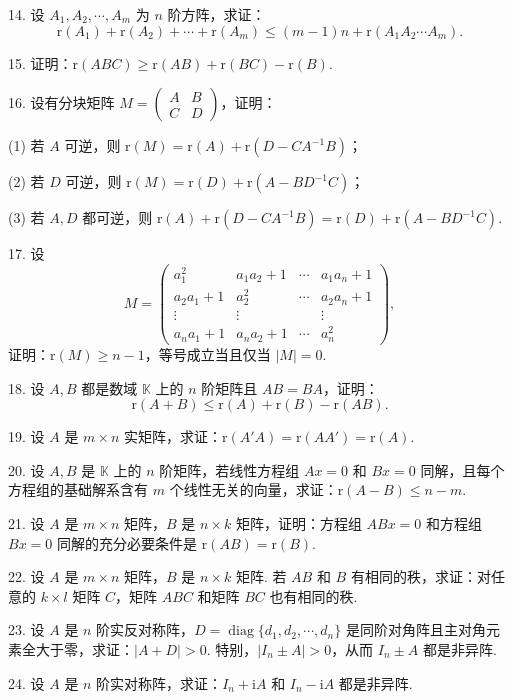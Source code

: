\documentclass[UTF8, 12pt, fontset=fandol, oneside]{ctexart}
\begin{document}
14. 设 $A_1,A_2,\cdots,A_m$ 为 $n$ 阶方阵，求证：
\[
\mathrm{r}(A_1)+\mathrm{r}(A_2)+\cdots+\mathrm{r}(A_m)\leq (m-1)n+\mathrm{r}(A_1A_2\cdots A_m).
\]

15. 证明：$\mathrm{r}(ABC)\geq \mathrm{r}(AB)+\mathrm{r}(BC)-\mathrm{r}(B)$.

16. 设有分块矩阵 $M=\left(\begin{array}{cc}A&B\\ C&D\end{array}\right)$，证明：

(1) 若 $A$ 可逆，则 $\mathrm{r}(M)=\mathrm{r}(A)+\mathrm{r}(D-CA^{-1}B)$；

(2) 若 $D$ 可逆，则 $\mathrm{r}(M)=\mathrm{r}(D)+\mathrm{r}(A-BD^{-1}C)$；

(3) 若 $A,D$ 都可逆，则 $\mathrm{r}(A)+\mathrm{r}(D-CA^{-1}B)=\mathrm{r}(D)+\mathrm{r}(A-BD^{-1}C)$.

17. 设
\[
M=\left(\begin{array}{cccc}
a_1^2&a_1a_2+1&\cdots&a_1a_n+1\\
a_2a_1+1&a_2^2&\cdots&a_2a_n+1\\
\vdots&\vdots&&\vdots\\
a_na_1+1&a_na_2+1&\cdots&a_n^2
\end{array}\right),
\]
证明：$\mathrm{r}(M)\geq n-1$，等号成立当且仅当 $|M|=0$.

18. 设 $A,B$ 都是数域 $\mathbb{K}$ 上的 $n$ 阶矩阵且 $AB=BA$，证明：
\[
\mathrm{r}(A+B)\leq \mathrm{r}(A)+\mathrm{r}(B)-\mathrm{r}(AB).
\]

19. 设 $A$ 是 $m\times n$ 实矩阵，求证：$\mathrm{r}(A'A)=\mathrm{r}(AA')=\mathrm{r}(A)$.

20. 设 $A,B$ 是 $\mathbb{K}$ 上的 $n$ 阶矩阵，若线性方程组 $Ax=0$ 和 $Bx=0$ 同解，且每个方程组的基础解系含有 $m$ 个线性无关的向量，求证：$\mathrm{r}(A-B)\leq n-m$.

21. 设 $A$ 是 $m\times n$ 矩阵，$B$ 是 $n\times k$ 矩阵，证明：方程组 $ABx=0$ 和方程组 $Bx=0$ 同解的充分必要条件是 $\mathrm{r}(AB)=\mathrm{r}(B)$.

22. 设 $A$ 是 $m\times n$ 矩阵，$B$ 是 $n\times k$ 矩阵. 若 $AB$ 和 $B$ 有相同的秩，求证：对任意的 $k\times l$ 矩阵 $C$，矩阵 $ABC$ 和矩阵 $BC$ 也有相同的秩.

23. 设 $A$ 是 $n$ 阶实反对称阵，$D=\operatorname{diag}\{d_1,d_2,\cdots,d_n\}$ 是同阶对角阵且主对角元素全大于零，求证：$|A+D|>0$. 特别，$|I_n\pm A|>0$，从而 $I_n\pm A$ 都是非异阵.

24. 设 $A$ 是 $n$ 阶实对称阵，求证：$I_n+\mathrm{i}A$ 和 $I_n-\mathrm{i}A$ 都是非异阵.
\end{document}

